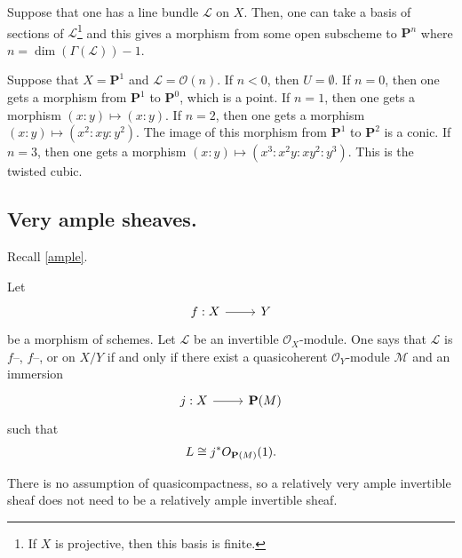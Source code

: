 \documentclass [11 pt, oneside] {article}
\begin{document}
Suppose that one has a line bundle $\mathscr{L}$ on $X$. Then, one can take a basis of sections of $\mathscr{L}$\footnote{If $X$ is projective, then this basis is finite.} and this gives a morphism from some open subscheme to $\mathbf{P}^n$ where $n=\dim(\Gamma(\mathscr{L}))-1$.  

\begin{example}[ ]\label{usefulnow}\text{}
Suppose that $X=\mathbf{P}^1$ and $\mathscr{L}=\mathscr{O}(n)$. If $n<0$, then $U =\emptyset$. If $n=0$, then one gets a morphism from $\mathbf{P}^1$ to $\mathbf{P}^0$, which is a point. 
If $n=1$, then one gets a morphism $(x:y)\longmapsto  (x:y)$.
If $n=2$, then one gets a morphism $(x:y)\longmapsto  (x^2:xy:y^2)$. The image of this morphism from $\mathbf{P}^1$ to $\mathbf{P}^2$ is a conic.
If $n=3$, then one gets a morphism $(x:y)\longmapsto  (x^3:x^2y:xy^2:y^3)$. This is the twisted cubic.
\end{example}

\subsection{Very ample sheaves.}
Recall \cref{ample}.

\begin{example}\label{}\text{}
Let 
\[
\begin{tikzcd}
f:X\ar[r]&Y
\end{tikzcd}
\]
be a morphism of schemes. Let $\mathscr{L}$ be an invertible $\mathscr{O}_X$-module. One says that $\mathscr{L}$ is $f$--, $f$--, or  on $X/Y$ if and only if there exist a quasicoherent $\mathscr{O}_Y$-module $\mathscr{M}$ and an immersion 
\[
\begin{tikzcd}
j:X\ar[r]&\mathbf{P}(\mathscr{M})
\end{tikzcd}
\]
such that 
\begin{align*}
	\relax{L}\cong j^*\relax{O}_{\mathbf{P}(\relax{M}) } (1).	
\end{align*}
\end{example}

\begin{remark}
	There is no assumption of quasicompactness, so a relatively very ample invertible sheaf does not need to be a relatively ample invertible sheaf.
\end{remark}
\end{document}
